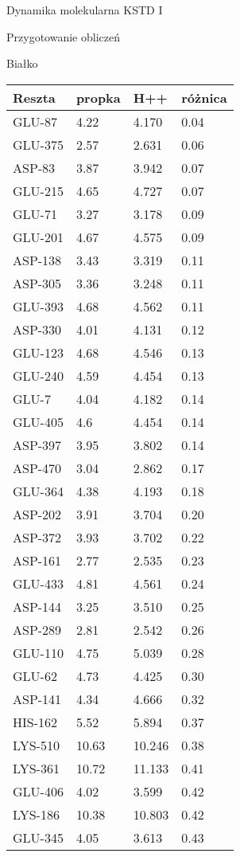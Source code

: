 \begin{section}{Dynamika molekularna KSTD I}
\begin{subsection}{Przygotowanie obliczeń}
\begin{subsubsection}{Białko}
\begin{longtable}{| p{} | p{} | p{} | p{} |} 
 \hline
 Reszta & propka & H++ & różnica  \\ [0.5ex] 
 \hline\hline
GLU-87 & 4.22 & 4.170 & 0.04\\
GLU-375 & 2.57 & 2.631 & 0.06\\
ASP-83 & 3.87 & 3.942 & 0.07\\
GLU-215 & 4.65 & 4.727 & 0.07\\
GLU-71 & 3.27 & 3.178 & 0.09\\
GLU-201 & 4.67 & 4.575 & 0.09\\
ASP-138 & 3.43 & 3.319 & 0.11\\
ASP-305 & 3.36 & 3.248 & 0.11\\
GLU-393 & 4.68 & 4.562 & 0.11\\
ASP-330 & 4.01 & 4.131 & 0.12\\
GLU-123 & 4.68 & 4.546 & 0.13\\
GLU-240 & 4.59 & 4.454 & 0.13\\
GLU-7 & 4.04 & 4.182 & 0.14\\
GLU-405 & 4.6 & 4.454 & 0.14\\
ASP-397 & 3.95 & 3.802 & 0.14\\
ASP-470 & 3.04 & 2.862 & 0.17\\
GLU-364 & 4.38 & 4.193 & 0.18\\
ASP-202 & 3.91 & 3.704 & 0.20\\
ASP-372 & 3.93 & 3.702 & 0.22\\
ASP-161 & 2.77 & 2.535 & 0.23\\
GLU-433 & 4.81 & 4.561 & 0.24\\
ASP-144 & 3.25 & 3.510 & 0.25\\
ASP-289 & 2.81 & 2.542 & 0.26\\
GLU-110 & 4.75 & 5.039 & 0.28\\
GLU-62 & 4.73 & 4.425 & 0.30\\
ASP-141 & 4.34 & 4.666 & 0.32\\
HIS-162 & 5.52 & 5.894 & 0.37\\
LYS-510 & 10.63 & 10.246 & 0.38\\
LYS-361 & 10.72 & 11.133 & 0.41\\
GLU-406 & 4.02 & 3.599 & 0.42\\
LYS-186 & 10.38 & 10.803 & 0.42\\
GLU-345 & 4.05 & 3.613 & 0.43\\

\end{longtable}
\end{subsubsection}
\end{subsection}
\end{section}
